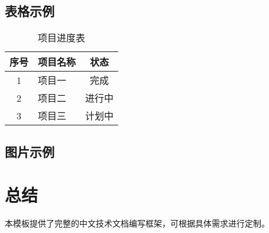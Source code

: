 \documentclass[fontset=windows]{article}
\begin{document}
\subsection{表格示例}
\begin{table}[htbp]
    \centering
    \begin{tabular}{|c|l|c|}
        \hline
        序号 & 项目名称 & 状态 \\
        \hline
        1 & 项目一 & 完成 \\
        2 & 项目二 & 进行中 \\
        3 & 项目三 & 计划中 \\
        \hline
    \end{tabular}
    \caption{项目进度表}
    \label{tab:progress}
\end{table}

\subsection{图片示例}

\section{总结}
本模板提供了完整的中文技术文档编写框架，可根据具体需求进行定制。

% 
\end{document}
